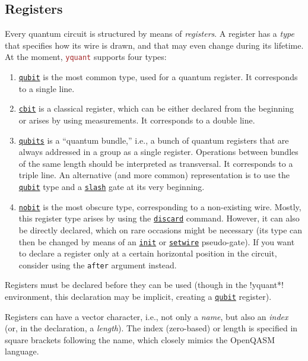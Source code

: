 \documentclass{scrartcl}
\def\pkg#1{\textcolor{brown}{\texttt{#1}}}
\def\gate#1{\hyperref[gate:#1]{\texttt{#1}}}
\def\Yquant{\pkg{yquant}}
\begin{document}
      \subsection{Registers}
         Every quantum circuit is structured by means of \emph{registers}.
         A register has a \emph{type} that specifies how its wire is drawn, and that may even change during its lifetime.
         At the moment, \Yquant{} supports four types:
         \begin{enumerate}
            \item \gate{qubit} is the most common type, used for a quantum register.
               It corresponds to a single line.
            \item \gate{cbit} is a classical register, which can be either declared from the beginning or arises by using measurements.
               It corresponds to a double line.
            \item \gate{qubits} is a ``quantum bundle,'' i.e., a bunch of quantum registers that are always addressed in a group as a single register.
               Operations between bundles of the same length should be interpreted as transversal.
               It corresponds to a triple line.
               An alternative (and more common) representation is to use the \gate{qubit} type and a \gate{slash} gate at its very beginning.
            \item \gate{nobit} is the most obscure type, corresponding to a non\hyp existing wire.
               Mostly, this register type arises by using the \gate{discard} command.
               However, it can also be directly declared, which on rare occasions might be necessary (its type can then be changed by means of an \gate{init} or \gate{setwire} pseudo\hyp gate).
               If you want to declare a register only at a certain horizontal position in the circuit, consider using the \texttt{after} argument instead.
         \end{enumerate}
         
         Registers must be declared before they can be used (though in the \tex!yquant*! environment, this declaration may be implicit, creating a \gate{qubit} register).
         
         Registers can have a vector character, i.e., not only a \emph{name}, but also an \emph{index} (or, in the declaration, a \emph{length}).
         The index (zero\hyp based) or length is specified in square brackets following the name, which closely mimics the OpenQASM language.
         
\end{document}
